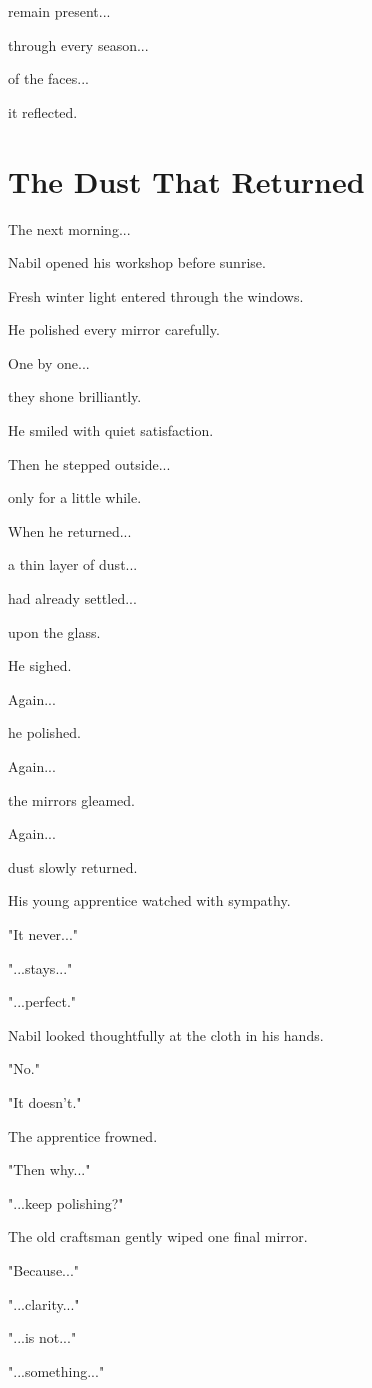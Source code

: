 \documentclass[12pt,openany]{book}
\begin{document}
remain present...

through every season...

of the faces...

it reflected.
\section*{The Dust That Returned}

The next morning...

Nabil opened his workshop before sunrise.

Fresh winter light entered through the windows.

He polished every mirror carefully.

One by one...

they shone brilliantly.

He smiled with quiet satisfaction.

Then he stepped outside...

only for a little while.

When he returned...

a thin layer of dust...

had already settled...

upon the glass.

He sighed.

Again...

he polished.

Again...

the mirrors gleamed.

Again...

dust slowly returned.

His young apprentice watched with sympathy.

"It never..."

"...stays..."

"...perfect."

Nabil looked thoughtfully at the cloth in his hands.

"No."

"It doesn't."

The apprentice frowned.

"Then why..."

"...keep polishing?"

The old craftsman gently wiped one final mirror.

"Because..."

"...clarity..."

"...is not..."

"...something..."
\end{document}
